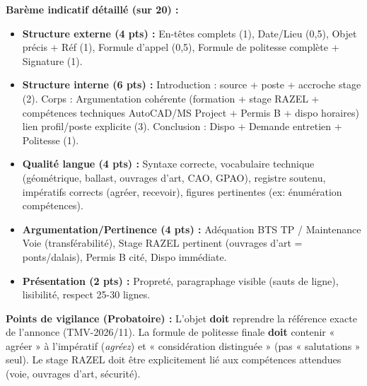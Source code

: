 \documentclass[11pt]{article}
\begin{document}
\begin{corrige}
\textbf{Barème indicatif détaillé (sur 20) :}
\begin{itemize}
    \item \textbf{Structure externe (4 pts) :} En-têtes complets (1), Date/Lieu (0,5), Objet précis + Réf (1), Formule d'appel (0,5), Formule de politesse complète + Signature (1).
    \item \textbf{Structure interne (6 pts) :} Introduction : source + poste + accroche stage (2). Corps : Argumentation cohérente (formation + stage RAZEL + compétences techniques AutoCAD/MS Project + Permis B + dispo horaires) lien profil/poste explicite (3). Conclusion : Dispo + Demande entretien + Politesse (1).
    \item \textbf{Qualité langue (4 pts) :} Syntaxe correcte, vocabulaire technique (géométrique, ballast, ouvrages d'art, CAO, GPAO), registre soutenu, impératifs corrects (agréer, recevoir), figures pertinentes (ex: énumération compétences).
    \item \textbf{Argumentation/Pertinence (4 pts) :} Adéquation BTS TP / Maintenance Voie (transférabilité), Stage RAZEL pertinent (ouvrages d'art = ponts/dalais), Permis B cité, Dispo immédiate.
    \item \textbf{Présentation (2 pts) :} Propreté, paragraphage visible (sauts de ligne), lisibilité, respect 25-30 lignes.
\end{itemize}
\textbf{Points de vigilance (Probatoire) :} L'objet \textbf{doit} reprendre la référence exacte de l'annonce (TMV-2026/11). La formule de politesse finale \textbf{doit} contenir « agréer » à l'impératif (\emph{agréez}) et « considération distinguée » (pas « salutations » seul). Le stage RAZEL doit être explicitement lié aux compétences attendues (voie, ouvrages d'art, sécurité).
\end{corrige}
\end{document}
